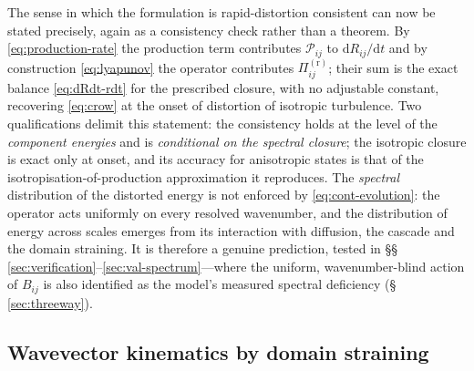 \documentclass[lineno]{JFM-FLM_Au}
\begin{document}
The sense in which the formulation is rapid-distortion consistent can now
be stated precisely, again as a consistency check rather than a theorem.
By \eqref{eq:production-rate} the production term contributes
$\mathcal{P}_{ij}$ to $\mathrm{d}R_{ij}/\mathrm{d}t$ and by construction
\eqref{eq:lyapunov} the operator contributes $\Pi^{(\mathrm r)}_{ij}$;
their sum is the exact balance \eqref{eq:dRdt-rdt} for the prescribed
closure, with no adjustable constant, recovering \eqref{eq:crow} at the
onset of distortion of isotropic turbulence. Two qualifications delimit
this statement: the consistency holds at the level of the
\emph{component energies} and is \emph{conditional on the
spectral closure}; the isotropic closure is exact only at onset, and its
accuracy for anisotropic states is that of the
isotropisation-of-production approximation it reproduces. The
\emph{spectral} distribution of the distorted energy is not enforced by
\eqref{eq:cont-evolution}: the operator acts uniformly on every resolved
wavenumber, and the distribution of energy across scales emerges from
its interaction with diffusion, the cascade and the domain straining. It
is therefore a genuine prediction, tested in
\S\S\,\ref{sec:verification}--\ref{sec:val-spectrum}---where the
uniform, wavenumber-blind action of $B_{ij}$ is also identified as the
model's measured spectral deficiency (\S\,\ref{sec:threeway}).

\subsection{Wavevector kinematics by domain straining}
\label{sec:domain-strain}
\end{document}
